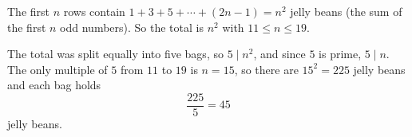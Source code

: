 The first $n$ rows contain $1+3+5+\cdots+(2n-1)=n^2$ jelly beans (the sum of the first $n$ odd numbers). So the total is $n^2$ with $11\le n\le19$.

The total was split equally into five bags, so $5\mid n^2$, and since $5$ is prime, $5\mid n$. The only multiple of $5$ from $11$ to $19$ is $n=15$, so there are $15^2=225$ jelly beans and each bag holds
\[
\dfrac{225}{5}=\boxed{45}
\]
jelly beans.
